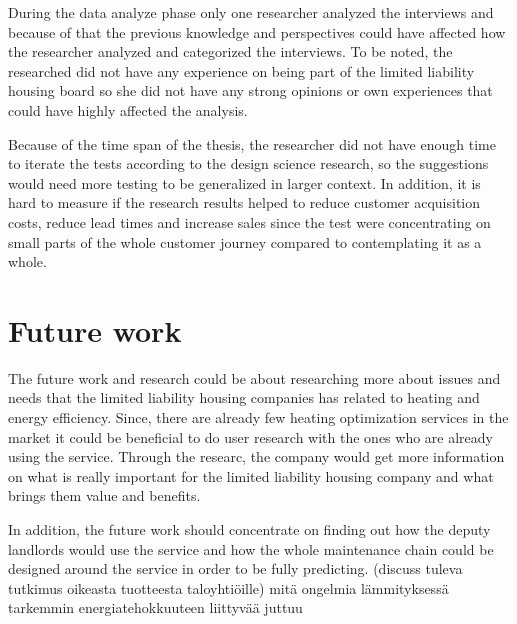 During the data analyze phase only one researcher analyzed the interviews and because of that the previous knowledge and perspectives could have affected how the researcher analyzed and categorized the interviews. To be noted, the researched did not have any experience on being part of the limited liability housing board so she did not have any strong opinions or own experiences that could have highly affected the analysis.

Because of the time span of the thesis, the researcher did not have enough time to iterate the tests according to the design science research, so the suggestions would need more testing to be generalized in larger context. In addition, it is hard to measure if the research results helped to reduce customer acquisition costs, reduce lead times and increase sales since the test were concentrating on small parts of the whole customer journey compared to contemplating it as a whole.

\section{Future work}

The future work and research could be about researching more about issues and needs that the limited liability housing companies has related to heating and energy efficiency. Since, there are already few heating optimization services in the market it could be beneficial to do user research with the ones who are already using the service. Through the researc, the company would get more information on what is really important for the limited liability housing company and what brings them value and benefits.

In addition, the future work should concentrate on finding out how the deputy landlords would use the service and how the whole maintenance chain could be designed around the service in order to be fully predicting.
(discuss tuleva tutkimus oikeasta tuotteesta taloyhtiöille)
mitä ongelmia lämmityksessä
tarkemmin energiatehokkuuteen liittyvää juttuu